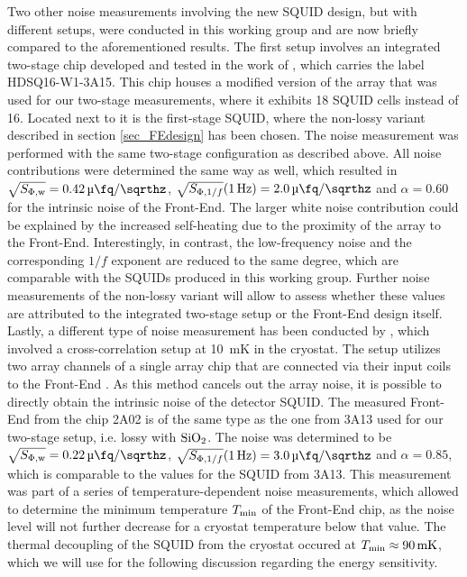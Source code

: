 Two other noise measurements involving the new SQUID design, but with different setups, were conducted in this working group and are now briefly compared to the aforementioned results. The first setup involves an integrated two-stage chip developed and tested in the work of \cite{Kraemer2023}, which carries the label HDSQ16-W1-3A15. This chip houses a modified version of the array that was used for our two-stage measurements, where it exhibits 18 SQUID cells instead of 16. Located next to it is the first-stage SQUID, where the non-lossy variant described in section \ref{sec_FEdesign} has been chosen. The noise measurement was performed with the same two-stage configuration as described above. All noise contributions were determined the same way as well, which resulted in $\sqrt{S_{\rm \Phi,w}}=\qty{0.42}{\micro\fq\per\sqrthz}$, $\sqrt{S_{{\rm \Phi},1/f}}(\qty{1}{\Hz})=\qty{2.0}{\micro\fq\per\sqrthz}$ and $\alpha=0.60$ for the  intrinsic noise of the Front-End. The larger white noise contribution could be explained by the increased self-heating due to the proximity of the array to the Front-End. Interestingly, in contrast, the low-frequency noise and the corresponding $1/f$ exponent are reduced to the same degree, which are comparable with the SQUIDs produced in this working group. Further noise measurements of the non-lossy variant will allow to assess whether these values are attributed to the integrated two-stage setup or the Front-End design itself. \\
Lastly, a different type of noise measurement has been conducted by \cite{Mazibrada2024}, which involved a cross-correlation setup at \qty{10}{\milli\kelvin} in the cryostat. The setup utilizes two array channels of a single array chip that are connected via their input coils to the Front-End \cite{Herbst2023}. As this method cancels out the array noise, it is possible to directly obtain the intrinsic noise of the detector SQUID. The measured Front-End from the chip 2A02 is of the same type as the one from 3A13 used for our two-stage setup, i.e. lossy with ${\rm SiO_2}$. The noise was determined to be $\sqrt{S_{\rm \Phi,w}}=\qty{0.22}{\micro\fq\per\sqrthz}$, $\sqrt{S_{{\rm \Phi},1/f}}(\qty{1}{\Hz})=\qty{3.0}{\micro\fq\per\sqrthz}$ and $\alpha=0.85$, which is comparable to the values for the SQUID from 3A13. This measurement was part of a series of temperature-dependent noise measurements, which allowed to determine the minimum temperature $T_{\rm min}$ of the Front-End chip, as the noise level will not further decrease for a cryostat temperature below that value. The thermal decoupling of the SQUID from the cryostat occured at $T_{\rm min}\approx\qty{90}{\milli\kelvin}$, which we will use for the following discussion regarding the energy sensitivity. \\

